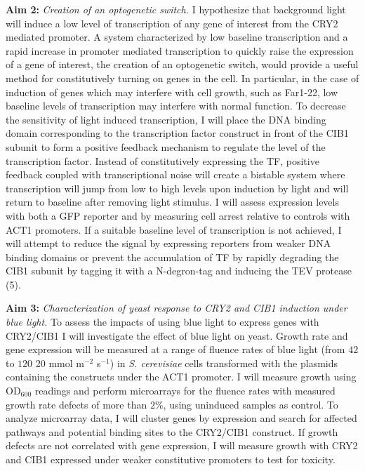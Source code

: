 \documentclass[12pt]{article}
\begin{document}
\textbf{Aim 2:} \emph{Creation of an optogenetic switch.}
I hypothesize that background light will induce a low level of transcription of any gene of interest from the CRY2 mediated promoter.  A system characterized by low baseline transcription and a rapid increase in promoter mediated transcription to quickly raise the expression of a gene of interest, the creation of an optogenetic switch, would provide a useful method for constitutively turning on genes in the cell. In particular, in the case of induction of genes which may interfere with cell growth, such as Far1-22, low baseline levels of transcription may interfere with normal function. To decrease the sensitivity of light induced transcription, I will place the DNA binding domain corresponding to the transcription factor construct in front of the CIB1 subunit to form a positive feedback mechanism to regulate the level of the transcription factor. Instead of constitutively expressing the TF, positive feedback coupled with transcriptional noise will create a bistable system where transcription will jump from low to high levels upon induction by light and will return to baseline after removing light stimulus.  I will assess expression levels with both a GFP reporter and by measuring cell arrest relative to controls with ACT1 promoters. If a suitable baseline level of transcription is not achieved, I will attempt to reduce the signal by expressing reporters from weaker DNA binding domains or prevent the accumulation of TF by rapidly degrading the CIB1 subunit by tagging it with a N-degron-tag and inducing the TEV protease (5).

\textbf{Aim 3:} \emph{Characterization of yeast response to CRY2 and CIB1 induction under blue light.}
To assess the impacts of using blue light to express genes with CRY2/CIB1 I will investigate the effect of blue light on yeast. Growth rate and gene expression will be measured at a range of fluence rates of blue light (from $42$ to $120$ 20 mmol m$^{−2}$ s$^{−1}$) in \emph{S. cerevisiae} cells transformed with the plasmids containing the constructs under the ACT1 promoter. I will measure growth using OD$_{600}$ readings and perform microarrays for the fluence rates with measured growth rate defects of more than $2\%$, using uninduced samples as control. To analyze microarray data, I will cluster genes by expression and search for affected pathways and potential binding sites to the CRY2/CIB1 construct. If growth defects are not correlated with gene expression, I will measure growth with CRY2 and CIB1 expressed under weaker constitutive promoters to test for toxicity. 
\end{document}
